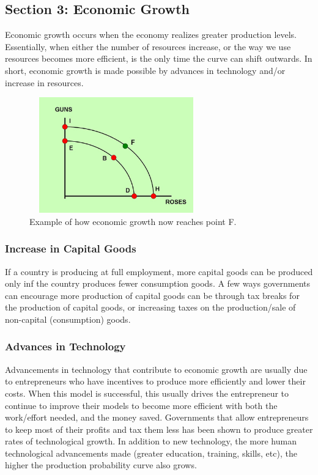 \documentclass[a4paper, 12pt] {article}
\begin{document}
\subsection{Section 3: Economic Growth}
Economic growth occurs when the economy realizes greater production levels.
Essentially, when either the number of resources increase, or the way we use
resources becomes more efficient, is the only time the curve can shift outwards.
In short, economic growth is made possible by advances in technology and/or
increase in resources.

\begin{figure}
    \centering
    \includegraphics[width=7.5cm, height=5cm]{economic_growth_graph.jpg}
    \caption{Example of how economic growth now reaches point F.}
    \label{fig:GnR2}
\end{figure}

\subsubsection{Increase in Capital Goods}
If a country is producing at full employment, more capital goods can be produced
only inf the country produces fewer consumption goods. A few ways governments
can encourage more production of capital goods can be through tax breaks for the
production of capital goods, or increasing taxes on the production/sale of
non-capital (consumption) goods.

\subsubsection{Advances in Technology}
Advancements in technology that contribute to economic growth are usually due to
entrepreneurs who have incentives to produce more efficiently and lower their
costs. When this model is successful, this usually drives the entrepreneur to 
continue to improve their models to become more efficient with both the work/effort
needed, and the money saved. Governments that allow entrepreneurs to keep most of
their profits and tax them less has been shown to produce greater rates of
technological growth. In addition to new technology, the more human technological
advancements made (greater education, training, skills, etc), the higher the 
production probability curve also grows.
\end{document}

